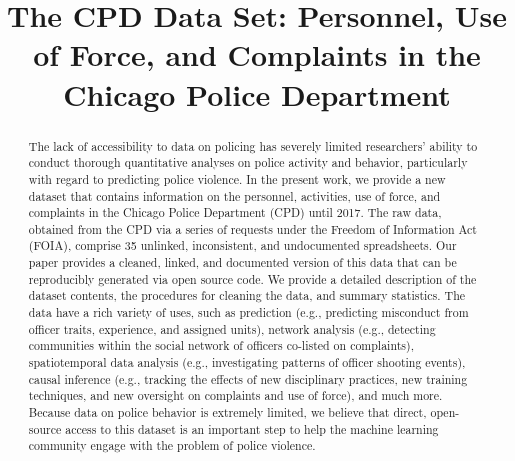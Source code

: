 \documentclass{article}
\title{The CPD Data Set: Personnel, Use of Force, and Complaints in the Chicago Police Department}
\begin{document}
\maketitle

\begin{abstract}
The lack of accessibility to data on policing has severely limited researchers’
ability to conduct thorough quantitative analyses on police activity and
behavior, particularly with regard to predicting police violence. In the
present work, we provide a new dataset that contains information on the
personnel, activities, use of force, and complaints in the Chicago Police
Department (CPD) until 2017. The raw data, obtained from the CPD via a series
of requests under the Freedom of Information Act (FOIA), comprise 35 unlinked,
inconsistent, and undocumented spreadsheets. Our paper provides a cleaned,
linked, and documented version of this data that can be reproducibly generated
via open source code. We provide a detailed description of the dataset
contents, the procedures for cleaning the data, and summary statistics. The
data have a rich variety of uses, such as prediction (e.g., predicting
misconduct from officer traits, experience, and assigned units), network
analysis (e.g., detecting communities within the social network of officers
co-listed on complaints), spatiotemporal data analysis (e.g., investigating
patterns of officer shooting events), causal inference (e.g., tracking the
effects of new disciplinary practices, new training techniques, and new
oversight on complaints and use of force), and much more. Because data on
police behavior is extremely limited, we believe that direct, open-source
access to this dataset is an important step to help the machine learning
community engage with the problem of police violence.
\end{abstract}










\end{document}
